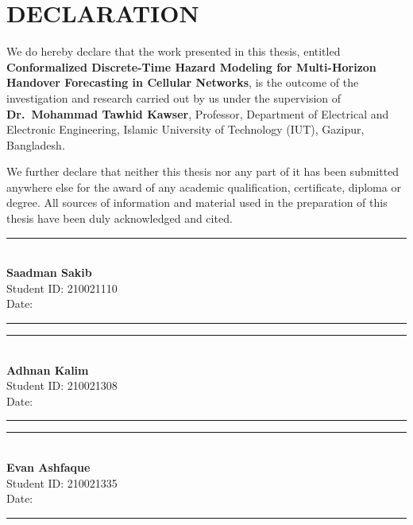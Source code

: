 \chapter*{DECLARATION}

We do hereby declare that the work presented in this thesis, entitled \textbf{Conformalized Discrete-Time Hazard Modeling for Multi-Horizon Handover Forecasting in Cellular Networks}, is the outcome of the investigation and research carried out by us under the supervision of \textbf{Dr.~Mohammad Tawhid Kawser}, Professor, Department of Electrical and Electronic Engineering, Islamic University of Technology (IUT), Gazipur, Bangladesh.

\vspace{0.8em}
We further declare that neither this thesis nor any part of it has been submitted anywhere else for the award of any academic qualification, certificate, diploma or degree. All sources of information and material used in the preparation of this thesis have been duly acknowledged and cited.

\vspace{3.5cm}
\noindent
\begin{minipage}[t]{0.32\textwidth}
\centering
\rule{4.5cm}{0.4pt}\\[0.4em]
\textbf{Saadman Sakib}\\
Student ID: 210021110\\[0.3em]
Date: \rule{2.5cm}{0.4pt}
\end{minipage}
\hfill
\begin{minipage}[t]{0.32\textwidth}
\centering
\rule{4.5cm}{0.4pt}\\[0.4em]
\textbf{Adhnan Kalim}\\
Student ID: 210021308\\[0.3em]
Date: \rule{2.5cm}{0.4pt}
\end{minipage}
\hfill
\begin{minipage}[t]{0.32\textwidth}
\centering
\rule{4.5cm}{0.4pt}\\[0.4em]
\textbf{Evan Ashfaque}\\
Student ID: 210021335\\[0.3em]
Date: \rule{2.5cm}{0.4pt}
\end{minipage}
